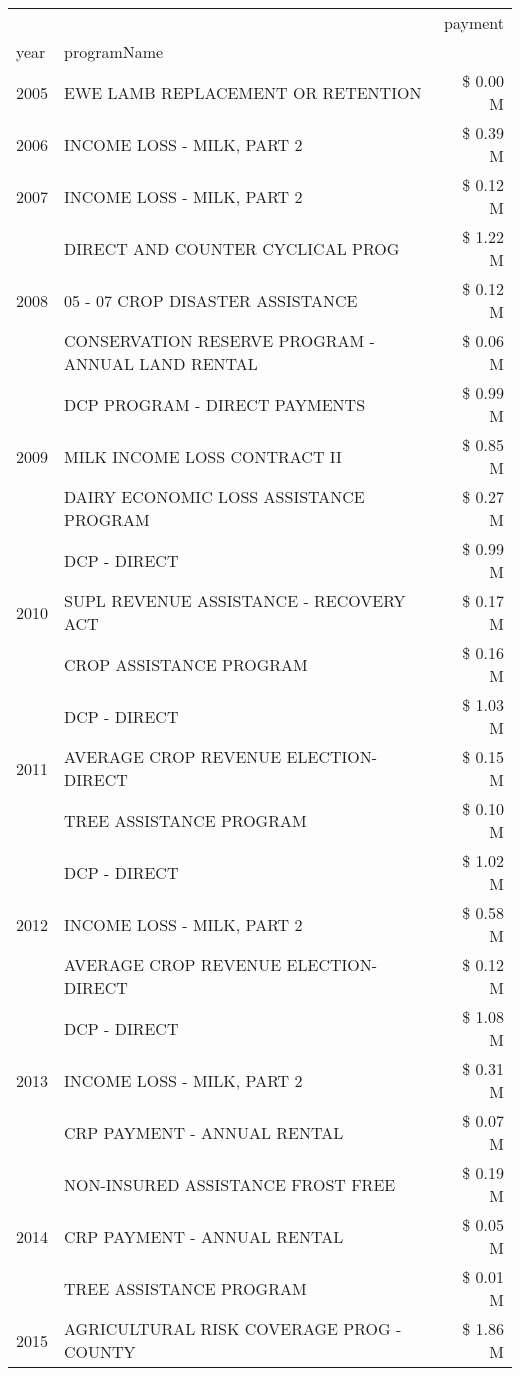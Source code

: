 \begin{tabular}{llr}
\toprule
 &  & payment \\
year & programName &  \\
\midrule
2005 & EWE LAMB REPLACEMENT OR RETENTION & \$ 0.00 M \\
\cline{1-3}
2006 & INCOME LOSS - MILK, PART 2 & \$ 0.39 M \\
\cline{1-3}
2007 & INCOME LOSS - MILK, PART 2 & \$ 0.12 M \\
\cline{1-3}
\multirow[t]{3}{*}{2008} & DIRECT AND COUNTER CYCLICAL PROG & \$ 1.22 M \\
 & 05 - 07 CROP DISASTER ASSISTANCE & \$ 0.12 M \\
 & CONSERVATION RESERVE PROGRAM - ANNUAL LAND RENTAL & \$ 0.06 M \\
\cline{1-3}
\multirow[t]{3}{*}{2009} & DCP PROGRAM - DIRECT PAYMENTS & \$ 0.99 M \\
 & MILK INCOME LOSS CONTRACT II & \$ 0.85 M \\
 & DAIRY ECONOMIC LOSS ASSISTANCE PROGRAM & \$ 0.27 M \\
\cline{1-3}
\multirow[t]{3}{*}{2010} & DCP - DIRECT & \$ 0.99 M \\
 & SUPL REVENUE ASSISTANCE - RECOVERY ACT & \$ 0.17 M \\
 & CROP ASSISTANCE PROGRAM & \$ 0.16 M \\
\cline{1-3}
\multirow[t]{3}{*}{2011} & DCP - DIRECT & \$ 1.03 M \\
 & AVERAGE CROP REVENUE ELECTION-DIRECT & \$ 0.15 M \\
 & TREE ASSISTANCE PROGRAM & \$ 0.10 M \\
\cline{1-3}
\multirow[t]{3}{*}{2012} & DCP - DIRECT & \$ 1.02 M \\
 & INCOME LOSS - MILK, PART 2 & \$ 0.58 M \\
 & AVERAGE CROP REVENUE ELECTION-DIRECT & \$ 0.12 M \\
\cline{1-3}
\multirow[t]{3}{*}{2013} & DCP - DIRECT & \$ 1.08 M \\
 & INCOME LOSS - MILK, PART 2 & \$ 0.31 M \\
 & CRP PAYMENT - ANNUAL RENTAL & \$ 0.07 M \\
\cline{1-3}
\multirow[t]{3}{*}{2014} & NON-INSURED ASSISTANCE FROST FREE & \$ 0.19 M \\
 & CRP PAYMENT - ANNUAL RENTAL & \$ 0.05 M \\
 & TREE ASSISTANCE PROGRAM & \$ 0.01 M \\
\cline{1-3}
\multirow[t]{3}{*}{2015} & AGRICULTURAL RISK COVERAGE PROG - COUNTY & \$ 1.86 M \\

\end{tabular}
